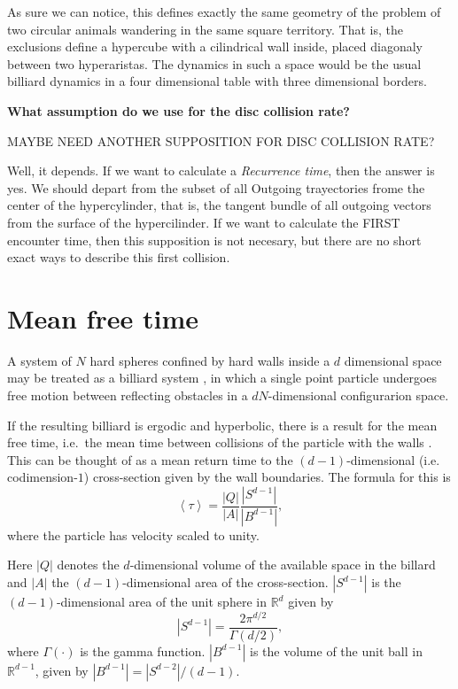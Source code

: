 \documentclass[a4paper,10pt]{article}
\newcommand{\mean}[1]{\left \langle #1 \right \rangle}
\newcommand{\RR}{\mathbb{R}}
\begin{document}
As sure we can notice, this defines exactly the same geometry of
the problem of two circular animals wandering in the same square territory. That is,
the exclusions define a hypercube with a cilindrical wall inside, placed
diagonaly between two hyperaristas. The dynamics in such a space
would be the usual billiard dynamics in a four dimensional table with
three dimensional borders.

\textbf{What assumption do we use for the disc collision rate?}

MAYBE NEED ANOTHER SUPPOSITION FOR DISC COLLISION RATE?

Well, it depends. If we want to calculate a \emph{Recurrence time}, then the answer is yes.
We should depart from the subset of all Outgoing trayectories frome the center of the
hypercylinder, that is, the tangent bundle of all outgoing vectors from 
the surface of the hypercilinder. If we want to calculate the FIRST encounter time, then
this supposition is not necesary, but there are no short exact ways to describe this first collision.


\section{Mean free time}

A system of $N$ hard spheres confined by hard walls inside a $d$ dimensional
space may be treated as a billiard system \cite{Sinai70, MarkChern}, 
in which a single point  particle undergoes free motion between reflecting obstacles 
in a $ d N $-dimensional configurarion space. 

If the resulting billiard is ergodic and hyperbolic, 
there is a result for the mean free time, i.e.\ the mean time between 
collisions of the particle with the walls \cite{MarkChern}. 
This can be thought of as a mean return time to the $(d-1)$-dimensional 
(i.e. codimension-$1$) cross-section given by the wall boundaries.
The formula for this is
\begin{equation}
 \mean{\tau} = \frac{|Q|}{|A|} \frac{|S^{d-1}|}{|B^{d-1}|},
\end{equation}
where the particle has velocity scaled to unity.

Here $|Q|$ denotes the $d$-dimensional volume of the available space in the billard and 
$|A|$ the $(d-1)$-dimensional area of the cross-section.
 $|S^{d-1}|$ is the $(d-1)$-dimensional area of the unit sphere in $\RR^d$ given by
\begin{equation}
  |S^{d-1}| = \frac{2 \pi^{d/2}}{\Gamma(d/2)},
\end{equation}
where $\Gamma(\cdot)$ is the gamma function. 
$|B^{d-1}|$ is the volume of the unit ball 
in $\RR^{d-1}$, given by $|B^{d-1}| = |S^{d-2}| / (d-1)$.
\end{document}
